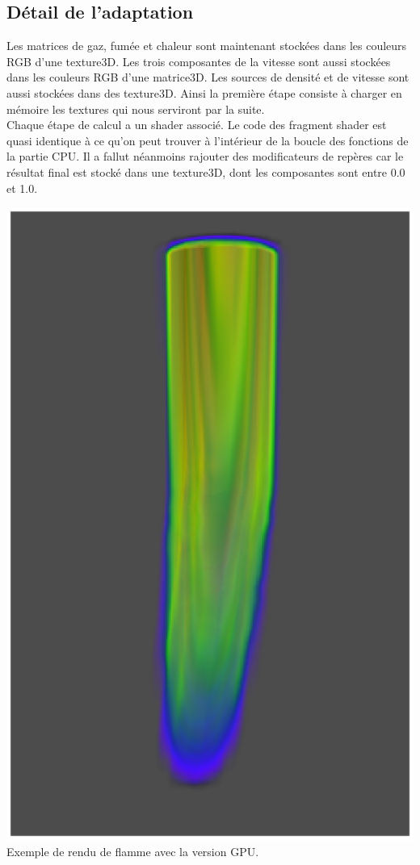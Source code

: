 \documentclass[a4paper,10pt]{article}
\begin{document}
\subsection{Détail de l'adaptation}
Les matrices de gaz, fumée et chaleur sont maintenant stockées dans les 
couleurs RGB d'une texture3D.
Les trois composantes de la vitesse sont aussi stockées dans les couleurs RGB 
d'une matrice3D.
Les sources de densité et de vitesse sont aussi stockées dans des texture3D.
Ainsi la première étape consiste à charger en mémoire les textures
qui nous serviront par la suite.\\

Chaque étape de calcul a un shader associé. Le code des fragment shader 
est quasi identique à ce qu'on peut trouver à l'intérieur de la boucle
des fonctions de la partie CPU. Il a fallut néanmoins rajouter des modificateurs
de repères car le résultat final est stocké dans une texture3D, dont les composantes
sont entre 0.0 et 1.0.\\


    \begin{center}
	\includegraphics[scale=0.5]{GPU.ps}\\
	Exemple de rendu de flamme avec la version GPU.\\
    \end{center}
 
\end{document}

